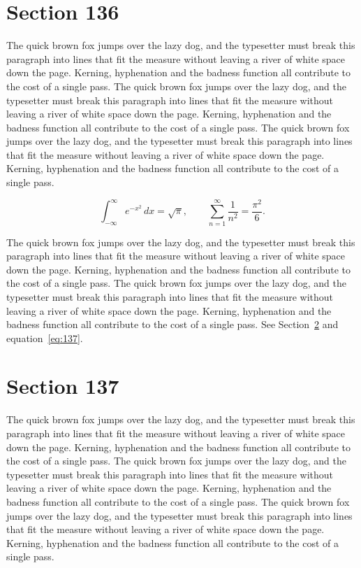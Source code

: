 \documentclass{article}
\begin{document}
\section{Section 136}
\label{sec:136}
The quick brown fox jumps over the lazy dog, and the typesetter must break this paragraph into lines that fit the measure without leaving a river of white space down the page. Kerning, hyphenation and the badness function all contribute to the cost of a single pass. The quick brown fox jumps over the lazy dog, and the typesetter must break this paragraph into lines that fit the measure without leaving a river of white space down the page. Kerning, hyphenation and the badness function all contribute to the cost of a single pass. The quick brown fox jumps over the lazy dog, and the typesetter must break this paragraph into lines that fit the measure without leaving a river of white space down the page. Kerning, hyphenation and the badness function all contribute to the cost of a single pass. 

\begin{equation}\label{eq:136}
\int_{-\infty}^{\infty} e^{-x^{2}}\,dx = \sqrt{\pi}, \qquad
\sum_{n=1}^{\infty} \frac{1}{n^{2}} = \frac{\pi^{2}}{6}.
\end{equation}

The quick brown fox jumps over the lazy dog, and the typesetter must break this paragraph into lines that fit the measure without leaving a river of white space down the page. Kerning, hyphenation and the badness function all contribute to the cost of a single pass. The quick brown fox jumps over the lazy dog, and the typesetter must break this paragraph into lines that fit the measure without leaving a river of white space down the page. Kerning, hyphenation and the badness function all contribute to the cost of a single pass. 
See Section~\ref{sec:137} and equation~\eqref{eq:137}.
\section{Section 137}
\label{sec:137}
The quick brown fox jumps over the lazy dog, and the typesetter must break this paragraph into lines that fit the measure without leaving a river of white space down the page. Kerning, hyphenation and the badness function all contribute to the cost of a single pass. The quick brown fox jumps over the lazy dog, and the typesetter must break this paragraph into lines that fit the measure without leaving a river of white space down the page. Kerning, hyphenation and the badness function all contribute to the cost of a single pass. The quick brown fox jumps over the lazy dog, and the typesetter must break this paragraph into lines that fit the measure without leaving a river of white space down the page. Kerning, hyphenation and the badness function all contribute to the cost of a single pass. 
\end{document}
